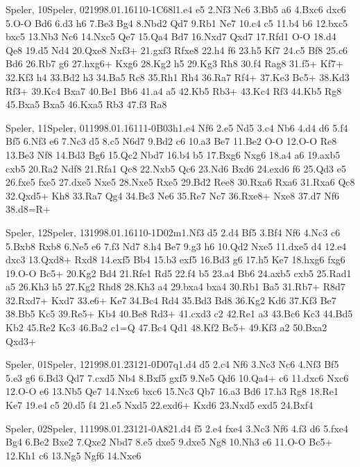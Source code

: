 \documentclass[twocolumn,a4paper,10pt]{report}
\begin{document}
\begin{chessgame}{Speler, 10}{Speler, 02}{1998.01.16}{11}{0-1}{C68l}{1.e4 e5 2.Nf3 Nc6 3.Bb5 a6 4.Bxc6 dxc6 5.O-O Bd6 6.d3 h6 7.Be3 Bg4 8.Nbd2 Qd7 9.Rb1 Ne7 10.c4 c5 11.b4 b6 12.bxc5 bxc5 13.Nb3 Nc6 14.Nxc5 Qe7 15.Qa4 Bd7 16.Nxd7 Qxd7 17.Rfd1 O-O 18.d4 Qe8 19.d5 Nd4 20.Qxe8 Nxf3+ 21.gxf3 Rfxe8 22.h4 f6 23.h5 Kf7 24.c5 Bf8 25.c6 Bd6 26.Rb7 g6 27.hxg6+ Kxg6 28.Kg2 h5 29.Kg3 Rh8 30.f4 Rag8 31.f5+ Kf7+ 32.Kf3 h4 33.Bd2 h3 34.Ba5 Rc8 35.Rh1 Rh4 36.Ra7 Rf4+ 37.Ke3 Bc5+ 38.Kd3 Rf3+ 39.Kc4 Bxa7 40.Be1 Bb6 41.a4 a5 42.Kb5 Rb3+ 43.Kc4 Rf3 44.Kb5 Rg8 45.Bxa5 Bxa5 46.Kxa5 Rb3 47.f3 Ra8\mate}\end{chessgame}
\begin{chessgame}{Speler, 11}{Speler, 01}{1998.01.16}{11}{1-0}{B03h}{1.e4 Nf6 2.e5 Nd5 3.c4 Nb6 4.d4 d6 5.f4 Bf5 6.Nf3 e6 7.Nc3 d5 8.c5 N6d7 9.Bd2 c6 10.a3 Be7 11.Be2 O-O 12.O-O Re8 13.Be3 Nf8 14.Bd3 Bg6 15.Qc2 Nbd7 16.b4 b5 17.Bxg6 Nxg6 18.a4 a6 19.axb5 cxb5 20.Ra2 Ndf8 21.Rfa1 Qc8 22.Nxb5 Qc6 23.Nd6 Bxd6 24.exd6 f6 25.Qd3 e5 26.fxe5 fxe5 27.dxe5 Nxe5 28.Nxe5 Rxe5 29.Bd2 Ree8 30.Rxa6 Rxa6 31.Rxa6 Qc8 32.Qxd5+ Kh8 33.Ra7 Qg4 34.Bc3 Ne6 35.Re7 Nc7 36.Rxe8+ Nxe8 37.d7 Nf6 38.d8=R+}\end{chessgame}
\begin{chessgame}{Speler, 12}{Speler, 13}{1998.01.16}{11}{0-1}{D02m}{1.Nf3 d5 2.d4 Bf5 3.Bf4 Nf6 4.Nc3 c6 5.Bxb8 Rxb8 6.Ne5 e6 7.f3 Nd7 8.h4 Be7 9.g3 h6 10.Qd2 Nxe5 11.dxe5 d4 12.e4 dxc3 13.Qxd8+ Rxd8 14.exf5 Bb4 15.b3 exf5 16.Bd3 g6 17.h5 Ke7 18.hxg6 fxg6 19.O-O Bc5+ 20.Kg2 Bd4 21.Rfe1 Rd5 22.f4 b5 23.a4 Bb6 24.axb5 cxb5 25.Rad1 a5 26.Kh3 h5 27.Kg2 Rhd8 28.Kh3 a4 29.bxa4 bxa4 30.Rb1 Ba5 31.Rb7+ R8d7 32.Rxd7+ Kxd7 33.e6+ Ke7 34.Bc4 Rd4 35.Bd3 Bd8 36.Kg2 Kd6 37.Kf3 Be7 38.Bb5 Kc5 39.Re5+ Kb4 40.Be8 Rd3+ 41.cxd3 c2 42.Re1 a3 43.Bc6 Kc3 44.Bd5 Kb2 45.Re2 Kc3 46.Ba2 c1=Q 47.Bc4 Qd1 48.Kf2 Bc5+ 49.Kf3 a2 50.Bxa2 Qxd3+}\end{chessgame}
\begin{chessgame}{Speler, 01}{Speler, 12}{1998.01.23}{12}{1-0}{D07q}{1.d4 d5 2.c4 Nf6 3.Nc3 Nc6 4.Nf3 Bf5 5.e3 g6 6.Bd3 Qd7 7.cxd5 Nb4 8.Bxf5 gxf5 9.Ne5 Qd6 10.Qa4+ c6 11.dxc6 Nxc6 12.O-O e6 13.Nb5 Qe7 14.Nxc6 bxc6 15.Nc3 Qb7 16.a3 Bd6 17.h3 Rg8 18.Re1 Ke7 19.e4 c5 20.d5 f4 21.e5 Nxd5 22.exd6+ Kxd6 23.Nxd5 exd5 24.Bxf4\mate}\end{chessgame}
\begin{chessgame}{Speler, 02}{Speler, 11}{1998.01.23}{12}{1-0}{A82}{1.d4 f5 2.e4 fxe4 3.Nc3 Nf6 4.f3 d6 5.fxe4 Bg4 6.Be2 Bxe2 7.Qxe2 Nbd7 8.e5 dxe5 9.dxe5 Ng8 10.Nh3 e6 11.O-O Bc5+ 12.Kh1 c6 13.Ng5 Ngf6 14.Nxe6}\end{chessgame}
\end{document}
